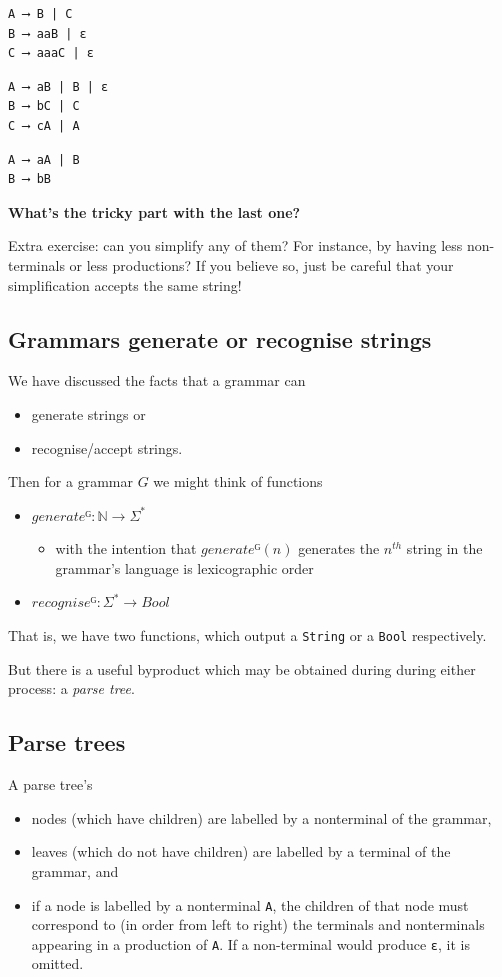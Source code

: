 \documentclass[11pt]{article}
\theoremstyle{definition}
\begin{document}
\begin{verbatim}
A ⟶ B | C
B ⟶ aaB | ε
C ⟶ aaaC | ε
\end{verbatim}

\begin{verbatim}
A ⟶ aB | B | ε
B ⟶ bC | C
C ⟶ cA | A
\end{verbatim}

\begin{verbatim}
A ⟶ aA | B
B ⟶ bB
\end{verbatim}

\textbf{What's the tricky part with the last one?}

Extra exercise: can you simplify any of them?
For instance, by having less non-terminals or less productions?
If you believe so, just be careful that
your simplification accepts the same string!

\subsection{Grammars generate or recognise strings}
\label{sec:org82cf952}
We have discussed the facts that a grammar can
\begin{itemize}
\item generate strings or
\item recognise/accept strings.
\end{itemize}

Then for a grammar \(G\) we might think of functions
\begin{itemize}
\item \(generateᴳ : ℕ → Σ^{*}\)
\begin{itemize}
\item with the intention that \(generateᴳ(n)\) generates the \(n^{th}\)
string in the grammar's language is lexicographic order
\end{itemize}
\item \(recogniseᴳ : Σ^{*} → Bool\)
\end{itemize}
That is, we have two functions, which output a \texttt{String} or
a \texttt{Bool} respectively.

But there is a useful byproduct which may be obtained during
during either process: a \emph{parse tree}.

\subsection{Parse trees}
\label{sec:org79b8bae}
A parse tree's
\begin{itemize}
\item nodes (which have children) are
labelled by a nonterminal of the grammar,
\item leaves (which do not have children) are
labelled by a terminal of the grammar, and
\item if a node is labelled by a nonterminal \texttt{A},
the children of that node must correspond to
(in order from left to right)
the terminals and nonterminals appearing in a production of \texttt{A}.
If a non-terminal would produce \texttt{ε}, it is omitted.
\end{itemize}
\end{document}
